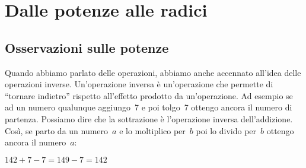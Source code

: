 














\section{Dalle potenze alle radici}
\label{sec:radicali_potenze_radici}

\subsection{Osservazioni sulle potenze}


Quando abbiamo parlato delle operazioni, abbiamo anche accennato all'idea
delle operazioni inverse. Un'operazione inversa è un'operazione che permette
di ``tornare indietro'' rispetto all'effetto prodotto da un'operazione.
Ad esempio se ad un numero qualunque aggiungo~7 e poi tolgo~7 ottengo ancora il 
numero di partenza. Possiamo dire che la sottrazione è l'operazione inversa 
dell'addizione. Così, se parto da un numero~\(a\) e lo moltiplico per~\(b\) poi lo 
divido per~\(b\) ottengo ancora il numero~\(a\):

\(142 + 7 - 7 = 149 -7 = 142\)

